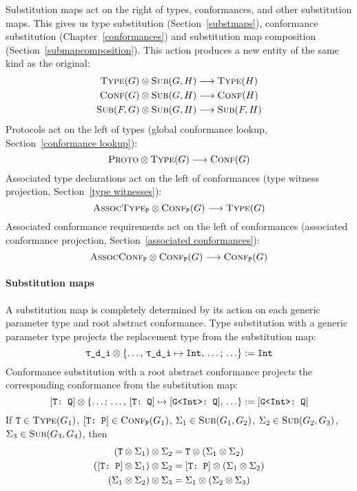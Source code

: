 \documentclass[../generics]{subfiles}
\begin{document}
Substitution maps act on the right of types, conformances, and other substitution maps. This gives us type substitution (Section~\ref{substmaps}), conformance substitution (Chapter~\ref{conformances}) and substitution map composition (Section~\ref{submapcomposition}). This action produces a new entity of the same kind as the original:
\begin{gather*}
\textsc{Type}({G})\otimes\textsc{Sub}({G, H})\longrightarrow\textsc{Type}({H})\\
\textsc{Conf}({G})\otimes\textsc{Sub}({G, H})\longrightarrow\textsc{Conf}({H})\\
\textsc{Sub}({F, G})\otimes\textsc{Sub}({G, H})\longrightarrow\textsc{Sub}({F, H})
\end{gather*}
Protocols act on the left of types (global conformance lookup, Section~\ref{conformance lookup}):
\[\textsc{Proto}\otimes\textsc{Type}({G})\longrightarrow\textsc{Conf}({G})\]
Associated type declarations act on the left of conformances (type witness projection, Section~\ref{type witnesses}):
\[\textsc{AssocType}_{\texttt{P}}\otimes\textsc{Conf}_{\texttt{P}}({G})\longrightarrow\textsc{Type}({G})\]
Associated conformance requirements act on the left of conformances (associated conformance projection, Section~\ref{associated conformances}):
\[\textsc{AssocConf}_{\texttt{P}}\otimes\textsc{Conf}_{\texttt{P}}({G})\longrightarrow\textsc{Conf}_{\texttt{P}}({G})\]

\paragraph{Substitution maps}
A substitution map is completely determined by its action on each generic parameter type and root abstract conformance. Type substitution with a generic parameter type projects the replacement type from the substitution map:
\[\texttt{$\uptau$\_d\_i} \otimes \{\ldots,\,\texttt{\texttt{$\uptau$\_d\_i}} \mapsto \texttt{Int},\,\ldots;\,\ldots\} := \texttt{Int}\]
Conformance substitution with a root abstract conformance projects the corresponding conformance from the substitution map:
\[
[\texttt{T}\texttt{:~Q}] \otimes \{\ldots;\,\ldots,\,[\texttt{T:~Q}] \mapsto [\texttt{G<Int>:~Q}],\,\ldots\} := [\texttt{G<Int>}\texttt{:~Q}]
\]
If $\texttt{T}\in\textsc{Type}({G_1})$, $[\texttt{T:~P}]\in\textsc{Conf}_{\texttt{P}}({G_1})$, $\Sigma_1\in\textsc{Sub}({G_1, G_2})$, $\Sigma_2\in\textsc{Sub}({G_2, G_3})$, $\Sigma_3\in\textsc{Sub}({G_3, G_4})$, then 
\begin{gather*}
(\texttt{T}\otimes \Sigma_1) \otimes \Sigma_2=\texttt{T}\otimes (\Sigma_1\otimes \Sigma_2)\\
([\texttt{T:~P}]\otimes \Sigma_1) \otimes \Sigma_2=[\texttt{T:~P}]\otimes (\Sigma_1\otimes \Sigma_2)\\
(\Sigma_1\otimes \Sigma_2) \otimes \Sigma_3=\Sigma_1\otimes(\Sigma_2\otimes \Sigma_3)
\end{gather*}
\end{document}
